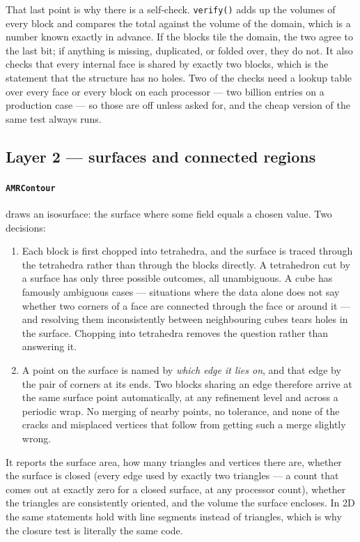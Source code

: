 \documentclass[11pt]{article}
\begin{document}
That last point is why there is a self-check. \texttt{verify()} adds up the
volumes of every block and compares the total against the volume of the domain,
which is a number known exactly in advance. If the blocks tile the domain, the
two agree to the last bit; if anything is missing, duplicated, or folded over,
they do not. It also checks that every internal face is shared by exactly two
blocks, which is the statement that the structure has no holes. Two of the
checks need a lookup table over every face or every block on each processor ---
two billion entries on a production case --- so those are off unless asked for,
and the cheap version of the same test always runs.

\subsection{Layer 2 --- surfaces and connected regions}

\paragraph{\texttt{AMRContour}} draws an isosurface: the surface where some
field equals a chosen value. Two decisions:

\begin{enumerate}
\item Each block is first chopped into tetrahedra, and the surface is traced
      through the tetrahedra rather than through the blocks directly. A
      tetrahedron cut by a surface has only three possible outcomes, all
      unambiguous. A cube has famously ambiguous cases --- situations where the
      data alone does not say whether two corners of a face are connected
      through the face or around it --- and resolving them inconsistently
      between neighbouring cubes tears holes in the surface. Chopping into
      tetrahedra removes the question rather than answering it.
\item A point on the surface is named by \emph{which edge it lies on}, and that
      edge by the pair of corners at its ends. Two blocks sharing an edge
      therefore arrive at the same surface point automatically, at any
      refinement level and across a periodic wrap. No merging of nearby points,
      no tolerance, and none of the cracks and misplaced vertices that follow
      from getting such a merge slightly wrong.
\end{enumerate}

It reports the surface area, how many triangles and vertices there are, whether
the surface is closed (every edge used by exactly two triangles --- a count that
comes out at exactly zero for a closed surface, at any processor count),
whether the triangles are consistently oriented, and the volume the surface
encloses. In 2D the same statements hold with line segments instead of
triangles, which is why the closure test is literally the same code.
\end{document}
